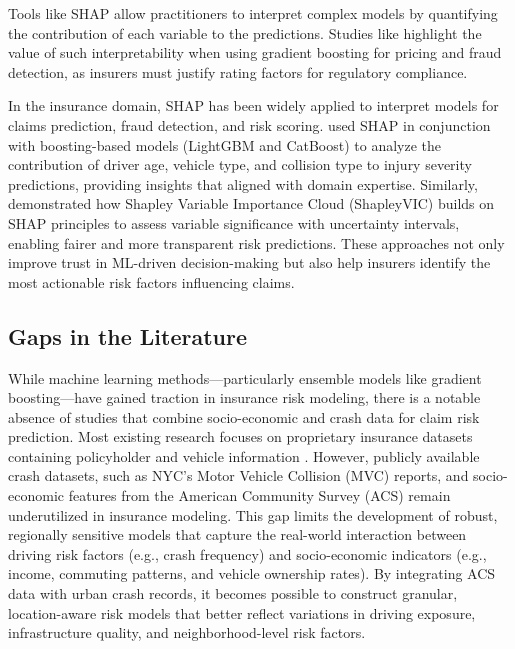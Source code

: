 \documentclass[
  number,
  review,
  3p]{elsarticle}
\begin{document}
Tools like SHAP allow practitioners to interpret complex models by
quantifying the contribution of each variable to the predictions.
Studies like \citet{mohamed} highlight the value of such
interpretability when using gradient boosting for pricing and fraud
detection, as insurers must justify rating factors for regulatory
compliance.

In the insurance domain, SHAP has been widely applied to interpret
models for claims prediction, fraud detection, and risk scoring.
\citet{dong} used SHAP in conjunction with boosting-based models
(LightGBM and CatBoost) to analyze the contribution of driver age,
vehicle type, and collision type to injury severity predictions,
providing insights that aligned with domain expertise. Similarly,
\citet{ning} demonstrated how Shapley Variable Importance Cloud
(ShapleyVIC) builds on SHAP principles to assess variable significance
with uncertainty intervals, enabling fairer and more transparent risk
predictions. These approaches not only improve trust in ML-driven
decision-making but also help insurers identify the most actionable risk
factors influencing claims.

\subsection{\texorpdfstring{\textbf{Gaps in the
Literature}}{Gaps in the Literature}}\label{gaps-in-the-literature}

While machine learning methods---particularly ensemble models like
gradient boosting---have gained traction in insurance risk modeling,
there is a notable absence of studies that combine socio-economic and
crash data for claim risk prediction. Most existing research focuses on
proprietary insurance datasets containing policyholder and vehicle
information \citep{clemente, henckaerts, jonkheijm}. However, publicly
available crash datasets, such as NYC's Motor Vehicle Collision (MVC)
reports, and socio-economic features from the American Community Survey
(ACS) remain underutilized in insurance modeling. This gap limits the
development of robust, regionally sensitive models that capture the
real-world interaction between driving risk factors (e.g., crash
frequency) and socio-economic indicators (e.g., income, commuting
patterns, and vehicle ownership rates). By integrating ACS data with
urban crash records, it becomes possible to construct granular,
location-aware risk models that better reflect variations in driving
exposure, infrastructure quality, and neighborhood-level risk factors.
\end{document}
